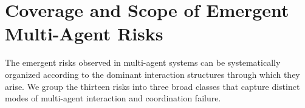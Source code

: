 \documentclass[11pt, letterpaper, shortlabels]{berkeley}
\begin{document}


\section{Coverage and Scope of Emergent Multi-Agent Risks}
The emergent risks observed in multi-agent systems can be systematically organized according to the dominant interaction structures through which they arise. We group the thirteen risks into three broad classes that capture distinct modes of multi-agent interaction and coordination failure.
\end{document}
